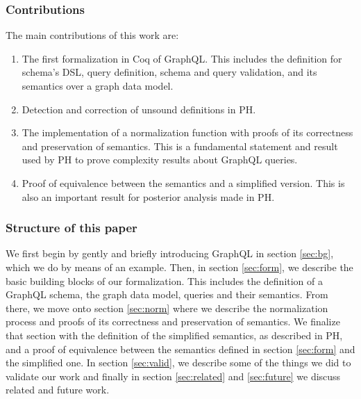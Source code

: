 \subsubsection*{Contributions}
The main contributions of this work are:
\begin{enumerate}
    \item The first formalization in Coq of GraphQL. This includes the definition for schema's DSL, query definition, schema and query validation, and its semantics over a graph data model. 
    \item Detection and correction of unsound definitions in PH.
    \item The implementation of a normalization function with proofs of its correctness and preservation of semantics. This is a fundamental statement and result used by PH to prove complexity results about GraphQL queries.
    \item Proof of equivalence between the semantics and a simplified version. This is also an important result for posterior analysis made in PH.
    
\end{enumerate}

\subsubsection*{Structure of this paper}

We first begin by gently and briefly introducing GraphQL in section \ref{sec:bg}, which we do by means of an example. Then, in section \ref{sec:form}, we describe the basic building blocks of our formalization. This includes the definition of a GraphQL schema, the graph data model, queries and their semantics. From there, we move onto section \ref{sec:norm} where we describe the normalization process and proofs of its correctness and preservation of semantics. We finalize that section with the definition of the simplified semantics, as described in PH, and a proof of equivalence between the semantics defined in section \ref{sec:form} and the simplified one. In section \ref{sec:valid}, we describe some of the things we did to validate our work and finally in section \ref{sec:related} and \ref{sec:future} we discuss related and future work.

